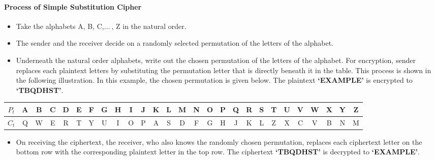 \documentclass[british]{article}
\providecommand{\tabularnewline}{\\}
\begin{document}
\paragraph{Process of Simple Substitution Cipher}
\begin{itemize}
\item Take the alphabets A, B, C,$\ldots\:$, Z in the natural order.
\item The sender and the receiver decide on a randomly selected permutation
of the letters of the alphabet.
\item Underneath the natural order alphabets, write out the chosen permutation
of the letters of the alphabet. For encryption, sender replaces each
plaintext letters by substituting the permutation letter that is directly
beneath it in the table. This process is shown in the following illustration.
In this example, the chosen permutation is given below. The plaintext
\textbf{\textquoteleft EXAMPLE\textquoteright{}} is encrypted to \textbf{\textquoteleft TBQDHST\textquoteright }.
\end{itemize}
\begin{center}
{\footnotesize{}}%
\begin{tabular}{|c|c|c|c|c|c|c|c|c|c|c|c|c|c|c|c|c|c|c|c|c|c|c|c|c|c|c|}
\hline 
{\footnotesize{}$P_t$} & {\footnotesize{}A} & {\footnotesize{}B} & {\footnotesize{}C} & {\footnotesize{}D} & {\footnotesize{}E} & {\footnotesize{}F} & {\footnotesize{}G} & {\footnotesize{}H} & {\footnotesize{}I} & {\footnotesize{}J} & {\footnotesize{}K} & {\footnotesize{}L} & {\footnotesize{}M} & {\footnotesize{}N} & {\footnotesize{}O} & {\footnotesize{}P} & {\footnotesize{}Q} & {\footnotesize{}R} & {\footnotesize{}S} & {\footnotesize{}T} & {\footnotesize{}U} & {\footnotesize{}V} & {\footnotesize{}W} & {\footnotesize{}X} & {\footnotesize{}Y} & {\footnotesize{}Z}\tabularnewline
\hline 
\hline 
{\footnotesize{}$C_t$} & {\footnotesize{}Q} & {\footnotesize{}W} & {\footnotesize{}E} & {\footnotesize{}R} & {\footnotesize{}T} & {\footnotesize{}Y} & {\footnotesize{}U} & {\footnotesize{}I} & {\footnotesize{}O} & {\footnotesize{}P} & {\footnotesize{}A} & {\footnotesize{}S} & {\footnotesize{}D} & {\footnotesize{}F} & {\footnotesize{}G} & {\footnotesize{}H} & {\footnotesize{}J} & {\footnotesize{}K} & {\footnotesize{}L} & {\footnotesize{}Z} & {\footnotesize{}X} & {\footnotesize{}C} & {\footnotesize{}V} & {\footnotesize{}B} & {\footnotesize{}N} & {\footnotesize{}M}\tabularnewline
\hline 
\end{tabular}{\footnotesize\par}
\par\end{center}
\begin{itemize}
\item On receiving the ciphertext, the receiver, who also knows the randomly
chosen permutation, replaces each ciphertext letter on the bottom
row with the corresponding plaintext letter in the top row. The ciphertext
\textbf{\textquoteleft TBQDHST\textquoteright{}} is decrypted to \textbf{\textquoteleft EXAMPLE\textquoteright }.
\end{itemize}
\end{document}
